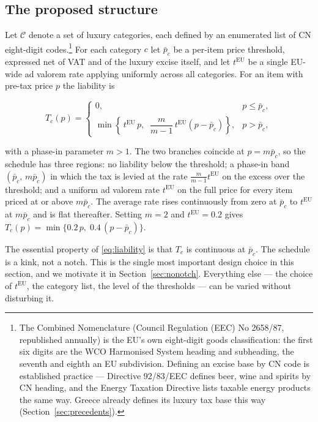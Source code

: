 \subsection{The proposed structure}

Let $\mathcal{C}$ denote a set of luxury categories, each defined by an enumerated list of CN
eight-digit codes.\footnote{The Combined Nomenclature (Council Regulation (EEC) No 2658/87,
republished annually) is the EU's own eight-digit goods classification: the first six digits are the
WCO Harmonised System heading and subheading, the seventh and eighth an EU subdivision. Defining an
excise base by CN code is established practice --- Directive 92/83/EEC defines beer, wine and
spirits by CN heading, and the Energy Taxation Directive lists taxable energy products the same
way. Greece already defines its luxury tax base this way (Section~\ref{sec:precedents}).} For each
category $c$ let $\bar{p}_c$ be a per-item price threshold, expressed net of VAT and of the luxury
excise itself, and let $t^{\mathrm{EU}}$ be a single EU-wide ad valorem rate applying uniformly
across all categories. For an item with pre-tax price $p$ the liability is

\begin{equation}
T_c(p) =
\begin{cases}
0, & p \leq \bar{p}_c,\\[2mm]
\min\left\{\, t^{\mathrm{EU}}\, p, \;\; \dfrac{m}{m-1}\, t^{\mathrm{EU}} \left(p - \bar{p}_c\right)\right\}, & p > \bar{p}_c,
\end{cases}
\label{eq:liability}
\end{equation}

with a phase-in parameter $m > 1$. The two branches coincide at $p = m\bar{p}_c$, so the schedule
has three regions: no liability below the threshold; a phase-in band $(\bar{p}_c,\, m\bar{p}_c)$ in
which the tax is levied at the rate $\tfrac{m}{m-1}t^{\mathrm{EU}}$ on the excess over the
threshold; and a uniform ad valorem rate $t^{\mathrm{EU}}$ on the full price for every item priced
at or above $m\bar{p}_c$. The average rate rises continuously from zero at $\bar{p}_c$ to
$t^{\mathrm{EU}}$ at $m\bar{p}_c$ and is flat thereafter. Setting $m=2$ and $t^{\mathrm{EU}}=0.2$
gives $T_c(p)=\min\{0.2\,p,\; 0.4\,(p-\bar{p}_c)\}$.

The essential property of \eqref{eq:liability} is that $T_c$ is continuous at $\bar{p}_c$. The
schedule is a kink, not a notch. This is the single most important design choice in this section,
and we motivate it in Section~\ref{sec:nonotch}. Everything else --- the choice of $t^{\mathrm{EU}}$,
the category list, the level of the thresholds --- can be varied without disturbing it.

